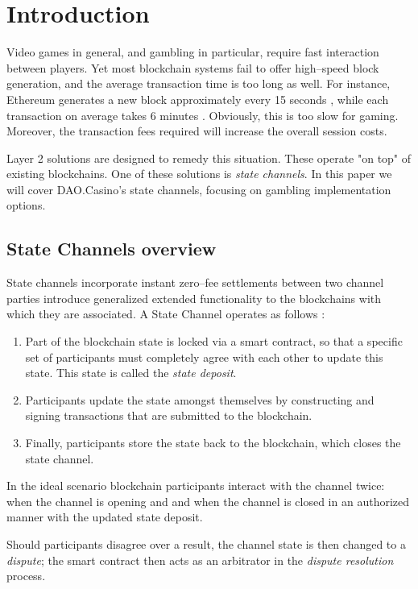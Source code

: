 \section{Introduction}
	Video games in general, and gambling in particular, require fast interaction between players. Yet most blockchain systems fail to offer high--speed block generation, and the average transaction time is too long as well. For instance, Ethereum generates a new block approximately every 15 seconds \cite{bib2}, while each transaction on average takes 6 minutes \cite{bib3}. Obviously, this is too slow for gaming. Moreover, the transaction fees required will increase the overall session costs.


	Layer 2 solutions \cite{bib4} are designed to remedy this situation. These operate "on top" of existing blockchains. One of these solutions is \textit{state channels}. In this paper we will cover DAO.Casino's state channels, focusing on gambling implementation options.


		\subsection {State Channels overview}
	State channels incorporate instant zero--fee settlements between two channel parties introduce generalized extended functionality to the blockchains with which they are associated. 
	A State Channel operates as follows \cite{bib5}:
	\begin{enumerate}
		\item Part of the blockchain state is locked via a smart contract, so that a specific set of participants must completely agree with each other to update this state. This state is called the \textit {state deposit}.
		\item Participants update the state amongst themselves by constructing and signing transactions that are submitted to the blockchain.
		\item Finally, participants store the state back to the blockchain, which closes the state channel.
	\end{enumerate}

	In the ideal scenario blockchain participants interact with the channel twice: when the channel is opening and and when the channel is closed in an authorized manner with the updated state deposit.

	Should participants disagree over a result, the channel state is then changed to a \textit {dispute}; the smart contract then acts as an arbitrator in the \textit {dispute resolution} process.

